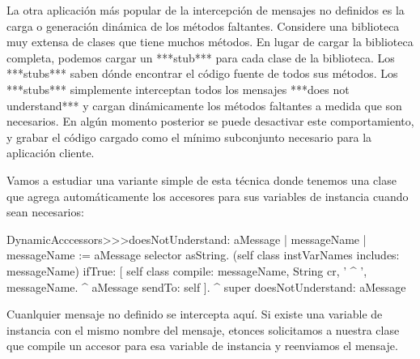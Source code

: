 \documentclass[a4paper,10pt,twoside]{book}
\begin{document}
La otra aplicación más popular de la intercepción de mensajes no
definidos es la carga o generación dinámica de los métodos faltantes.
Considere una biblioteca muy extensa de clases que tiene muchos
métodos.  En lugar de cargar la biblioteca completa, podemos cargar un
***stub*** para cada clase de la biblioteca.  Los ***stubs*** saben
dónde encontrar el código fuente de todos sus métodos.  Los
***stubs*** simplemente interceptan todos los mensajes ***does not
understand*** y cargan dinámicamente los métodos faltantes a medida
que son necesarios.  En algún momento posterior se puede desactivar
este comportamiento, y grabar el código cargado como el mínimo
subconjunto necesario para la aplicación cliente.


Vamos a estudiar una variante simple de esta técnica donde tenemos una
clase que agrega automáticamente los accesores para sus variables de
instancia cuando sean necesarios:

\begin{code}{}
DynamicAcccessors>>>doesNotUnderstand: aMessage
        | messageName |
        messageName := aMessage selector asString.
        (self class instVarNames includes: messageName)
                ifTrue: [
                        self class compile: messageName, String cr, ' ^ ', messageName.
                        ^ aMessage sendTo: self ].
        ^ super doesNotUnderstand: aMessage
\end{code}
Cuanlquier mensaje no definido se intercepta aquí.  Si existe una
variable de instancia con el mismo nombre del mensaje, etonces
solicitamos a nuestra clase que compile un accesor para esa variable
de instancia y reenviamos el mensaje.

\end{document}
